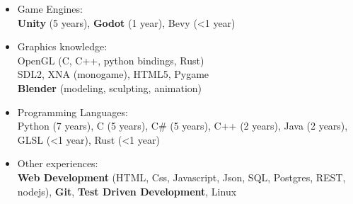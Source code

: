 \documentclass[10pt]{article}
\begin{document}
{\begin{itemize}
	\item \textcolor{coolred} {Game Engines:} \\
	\textbf{Unity} (5 years), \textbf{Godot} (1 year), Bevy (<1 year) \\

	\item \textcolor{coolred} {Graphics knowledge:} \\
	OpenGL (C, C++, python bindings, Rust) \\
	SDL2, XNA (monogame), HTML5, Pygame \\ 
	\textbf{Blender} (modeling, sculpting, animation) 

	\item \textcolor{coolred} {Programming Languages:} \\
	Python (7 years), C (5 years), C\# (5 years), C++ (2 years), Java (2 years), GLSL (<1 year), Rust (<1 year)

	\item \textcolor{coolred} {Other experiences:} \\
		\textbf{Web Development} (HTML, Css, Javascript, Json, SQL, Postgres, REST, nodejs), \textbf{Git}, \textbf{Test Driven Development}, Linux
\end{itemize}
}
\end{document}
